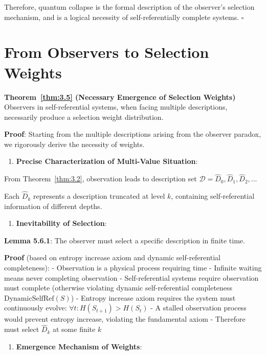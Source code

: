 Therefore, quantum collapse is the formal description of the observer's selection mechanism, and is a logical necessity of self-referentially complete systems. $\square$

\section{From Observers to Selection Weights}
\label{sec:ch05_quantum:from-observers-to-selection-weights}

\textbf{Theorem~\ref{thm:3.5} (Necessary Emergence of Selection Weights)}
\label{thm:3.5}
Observers in self-referential systems, when facing multiple descriptions, necessarily produce a selection weight distribution.

\textbf{Proof}:
Starting from the multiple descriptions arising from the observer paradox, we rigorously derive the necessity of weights.

\begin{enumerate}
\item \textbf{Precise Characterization of Multi-Value Situation}:
\end{enumerate}
   From Theorem~\ref{thm:3.2}, observation leads to description set $\mathcal{D} = {\hat{D}_0, \hat{D}_1, \hat{D}_2, ...}$
   
   Each $\hat{D}_k$ represents a description truncated at level $k$, containing self-referential information of different depths.

\begin{enumerate}
\item \textbf{Inevitability of Selection}:
\end{enumerate}
   
   \textbf{Lemma 5.6.1}: The observer must select a specific description in finite time.
\label{thm:3.5}
   
   \textbf{Proof} (based on entropy increase axiom and dynamic self-referential completeness):
   - Observation is a physical process requiring time
   - Infinite waiting means never completing observation
   - Self-referential systems require observation must complete (otherwise violating dynamic self-referential completeness $\text{DynamicSelfRef}(S)$)
   - Entropy increase axiom requires the system must continuously evolve: $\forall t: H(S_{t+1}) > H(S_t)$
   - A stalled observation process would prevent entropy increase, violating the fundamental axiom
   - Therefore must select $\hat{D}_k$ at some finite $k$

\begin{enumerate}
\item \textbf{Emergence Mechanism of Weights}:
\end{enumerate}
   
